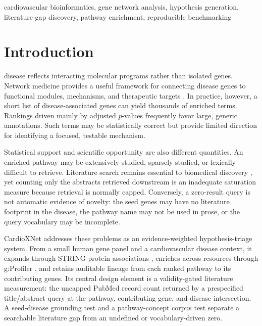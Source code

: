 \documentclass{ieeeaccess}
\begin{document}
\begin{keywords}
cardiovascular bioinformatics, gene network analysis, hypothesis generation, literature-gap discovery, pathway enrichment, reproducible benchmarking
\end{keywords}

\titlepgskip=-18pt
\maketitle

\section{Introduction}
\label{sec:introduction}
 disease reflects interacting molecular programs rather than isolated genes. Network medicine provides a useful framework for connecting disease genes to functional modules, mechanisms, and therapeutic targets \cite{barabasi2011network}. In practice, however, a short list of disease-associated genes can yield thousands of enriched terms. Rankings driven mainly by adjusted $p$-values frequently favor large, generic annotations. Such terms may be statistically correct but provide limited direction for identifying a focused, testable mechanism.

Statistical support and scientific opportunity are also different quantities. An enriched pathway may be extensively studied, sparsely studied, or lexically difficult to retrieve. Literature search remains essential to biomedical discovery \cite{jin2024pubmed}, yet counting only the abstracts retrieved downstream is an inadequate saturation measure because retrieval is normally capped. Conversely, a zero-result query is not automatic evidence of novelty: the seed genes may have no literature footprint in the disease, the pathway name may not be used in prose, or the query vocabulary may be incomplete.

CardioXNet addresses these problems as an evidence-weighted hypothesis-triage system. From a small human gene panel and a cardiovascular disease context, it expands through STRING protein associations \cite{szklarczyk2023string}, enriches across resources through g:Profiler \cite{raudvere2019gprofiler}, and retains auditable lineage from each ranked pathway to its contributing genes. Its central design element is a validity-gated literature measurement: the uncapped PubMed record count returned by a prespecified title/abstract query at the pathway, contributing-gene, and disease intersection. A seed-disease grounding test and a pathway-concept corpus test separate a searchable literature gap from an undefined or vocabulary-driven zero.
\end{document}
